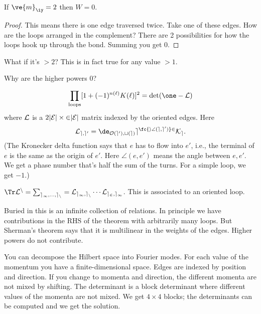 \begin{lem}
If $\ve{m}_{\iy}=2$ then $W=0$.
\end{lem}
\begin{proof}
This means there is one edge traversed twice. Take one of these edges. How are the loops arranged in the complement? There are 2 possibilities for how the loops hook up through the bond. Summing you get 0.
\end{proof}
What if it's $>2$? This is in fact true for any value $>1$.

Why are the higher powers 0? %

\begin{thm}[Sherman]\label{thm:sherman} %
\[
\prod_{\text{loops}} [1+(-1)^{n(\ell)}K(\ell)]^2 = \det(\one - \cal L)
\]
where $\cal L$ is a $2|\cal E|\times 2|\cal E|$ matrix indexed by the oriented edges. Here 
\[
\cal L_{e,e'} = \de_{O(e'),t(e)} e^{\fc{i\angle(e,e')}2}K_e.
\]
(The Kronecker delta function says that $e$ has to flow into $e'$, i.e., the terminal of $e$ is the same as the origin of $e'$. Here $\angle(e,e')$ means the angle between $e,e'$. We get a phase number that's half the sum of the turns. For a simple loop, we get $-1$.)
\end{thm}
$\Tr \cal L^n = \sum_{e_1,\ldots, e_n} = \cal L_{e_1,e_n}\cdots \cal L_{e_2,e_1}$. This is associated to an oriented loop.

Buried in this is an infinite collection of relations. In principle we have contributions in the RHS of the theorem with arbitrarily many loops. But Sherman's theorem says that it is multilinear in the weights of the edges. Higher powers do not contribute. 

You can decompose the Hilbert space into Fourier modes. For each value of the momentum you have a finite-dimensional space. Edges are indexed by position and direction. If you change to momenta and direction, the different momenta are not mixed by shifting. The determinant is a block determinant where different values of the momenta are not mixed. We get $4\times 4$ blocks; the determinants can be computed and we get the solution.